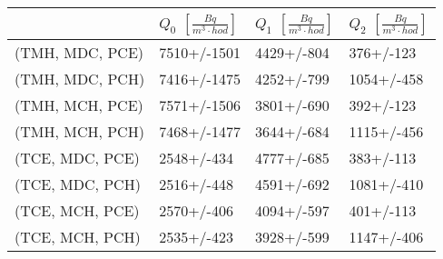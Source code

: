 \begin{tabular}{llll}
\toprule
{} & $Q_0$ $\left[\si{\frac{Bq}{m^3\cdot hod}}\right]$ & $Q_1$ $\left[\si{\frac{Bq}{m^3\cdot hod}}\right]$ & $Q_2$ $\left[\si{\frac{Bq}{m^3\cdot hod}}\right]$ \\
\midrule
(TMH, MDC, PCE) &7510+/-1501 &   4429+/-804 &                                         376+/-123 \\
(TMH, MDC, PCH) &7416+/-1475 &   4252+/-799 &                                        1054+/-458 \\
(TMH, MCH, PCE) &7571+/-1506 &   3801+/-690 &                                         392+/-123 \\
(TMH, MCH, PCH) &7468+/-1477 &   3644+/-684 &                                        1115+/-456 \\
(TCE, MDC, PCE) & 2548+/-434 &   4777+/-685 &                                         383+/-113 \\
(TCE, MDC, PCH) & 2516+/-448 &   4591+/-692 &                                        1081+/-410 \\
(TCE, MCH, PCE) & 2570+/-406 &   4094+/-597 &                                         401+/-113 \\
(TCE, MCH, PCH) & 2535+/-423 &   3928+/-599 &                                        1147+/-406 \\
\bottomrule
\end{tabular}
